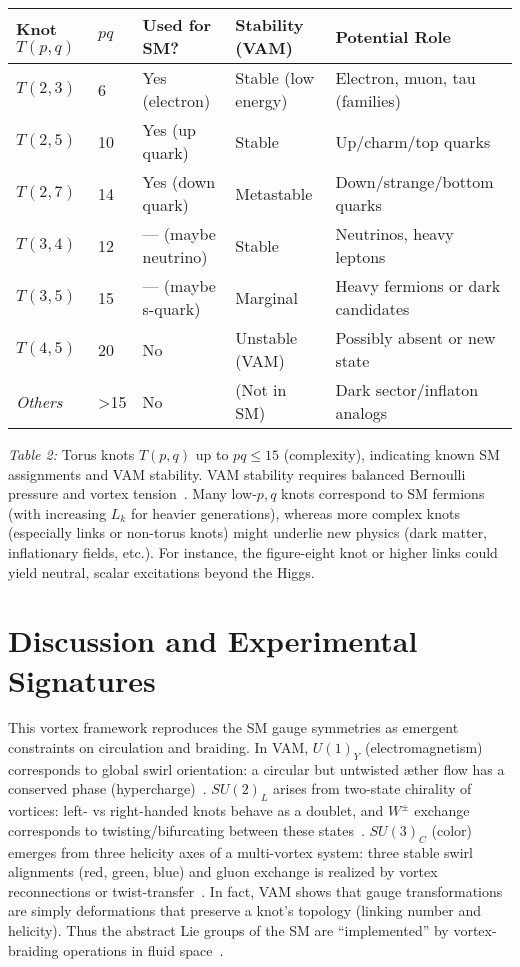 \documentclass[a4paper,12pt]{article}
\begin{document}
\begin{table}
    \centering
    \begin{tabular}{lllll}
        \toprule
        \textbf{Knot $T(p,q)$} & \textbf{$pq$} & \textbf{Used for SM?} & \textbf{Stability (VAM)} & \textbf{Potential Role} \\
        \midrule
        $T(2,3)$ & 6 & Yes (electron) & Stable (low energy) & Electron, muon, tau (families) \\
        $T(2,5)$ & 10 & Yes (up quark) & Stable & Up/charm/top quarks \\
        $T(2,7)$ & 14 & Yes (down quark) & Metastable & Down/strange/bottom quarks \\
        $T(3,4)$ & 12 & — (maybe neutrino) & Stable & Neutrinos, heavy leptons \\
        $T(3,5)$ & 15 & — (maybe s-quark) & Marginal & Heavy fermions or dark candidates \\
        $T(4,5)$ & 20 & No & Unstable (VAM) & Possibly absent or new state \\
        \textit{Others} & >15 & No & (Not in SM) & Dark sector/inflaton analogs \\
        \bottomrule
    \end{tabular}
    \caption{}
    \label{tab:}
\end{table}



\textit{Table 2:} Torus knots $T(p,q)$ up to $pq\leq 15$ (complexity), indicating known SM assignments and VAM stability. VAM stability requires balanced Bernoulli pressure and vortex tension~\cite{Appendix_CalculateNeucleusMass,4-StandardModel-Lagrangian-VAM}. Many low-$p,q$ knots correspond to SM fermions (with increasing $L_k$ for heavier generations), whereas more complex knots (especially links or non-torus knots) might underlie new physics (dark matter, inflationary fields, etc.). For instance, the figure-eight knot or higher links could yield neutral, scalar excitations beyond the Higgs.

\section*{Discussion and Experimental Signatures}
This vortex framework reproduces the SM gauge symmetries as emergent constraints on circulation and braiding. In VAM, $U(1)_Y$ (electromagnetism) corresponds to global swirl orientation: a circular but untwisted æther flow has a conserved phase (hypercharge)~\cite{4-StandardModel-Lagrangian-VAM}. $SU(2)_L$ arises from two-state chirality of vortices: left- vs right-handed knots behave as a doublet, and $W^\pm$ exchange corresponds to twisting/bifurcating between these states~\cite{4-StandardModel-Lagrangian-VAM}. $SU(3)_C$ (color) emerges from three helicity axes of a multi-vortex system: three stable swirl alignments (red, green, blue) and gluon exchange is realized by vortex reconnections or twist-transfer~\cite{4-StandardModel-Lagrangian-VAM}. In fact, VAM shows that gauge transformations are simply deformations that preserve a knot’s topology (linking number and helicity). Thus the abstract Lie groups of the SM are “implemented” by vortex-braiding operations in fluid space~\cite{4-StandardModel-Lagrangian-VAM}.
\end{document}
